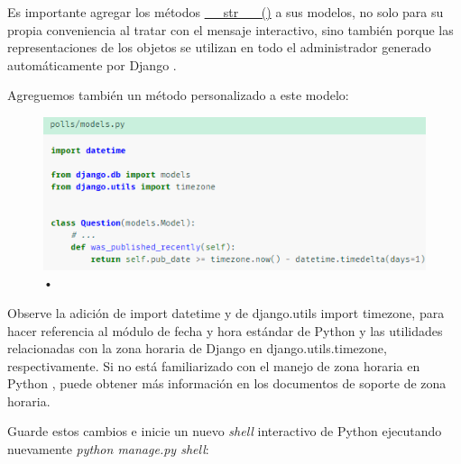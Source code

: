 \documentclass[10pt]{article}
\newcommand{\py}[1]{{\textcolor{B}{Python} #1}}
\newcommand{\django}[1]{{\textcolor{G}{Django} #1}}
\begin{document}
Es importante agregar los métodos {\href{https://docs.djangoproject.com/en/3.0/ref/models/instances/\#django.db.models.Model.\_\_str\_\_()}{\textcolor{B}{\_\_str \_\_()}}} a sus modelos, no solo para su propia conveniencia al tratar con el mensaje interactivo, sino también porque las representaciones de los objetos se utilizan en todo el administrador generado automáticamente por \django{}.

Agreguemos también un método personalizado a este modelo:
\\
\begin{figure}[H]
\begin{center}
\renewcommand{\arraystretch}{1.3}
\includegraphics[scale=1]{figuras/3/32/324/img3.png}
\caption{•}
\end{center}
\end{figure}

Observe la adición de \textcolor{G}{import datetime} y de \textcolor{G}{django.utils import timezone}, para hacer referencia al módulo de fecha y hora estándar de \py{} y las utilidades relacionadas con la zona horaria de \django{} en \textcolor{G}{django.utils.timezone}, respectivamente. Si no está familiarizado con el manejo de zona horaria en \py{}, puede obtener más información en los documentos de soporte de zona horaria.


Guarde estos cambios e inicie un nuevo \textit{shell} interactivo de \py{} ejecutando nuevamente \textit{python manage.py shell}:
\end{document}
